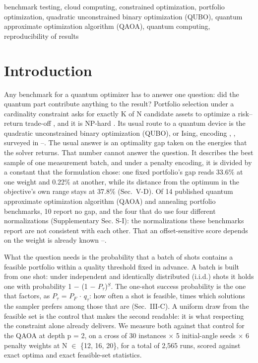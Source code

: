 \documentclass{ieeeaccess}
\begin{document}
\begin{keywords}
benchmark testing, cloud computing, constrained optimization, portfolio optimization, quadratic unconstrained binary optimization (QUBO), quantum approximate optimization algorithm (QAOA), quantum computing, reproducibility of results
\end{keywords}

\titlepgskip=-15pt

\maketitle


\section{Introduction}


Any benchmark for a quantum optimizer has to answer one question: did the quantum part contribute anything to the result? Portfolio selection under a cardinality constraint asks for exactly K of N candidate assets to optimize a risk--return trade-off \cite{ref1}, and it is NP-hard \cite{ref2}. Its usual route to a quantum device is the quadratic unconstrained binary optimization (QUBO), or Ising, encoding \cite{ref3}, \cite{ref4}, surveyed in \cite{ref5}--\cite{ref7}. The usual answer is an optimality gap taken on the energies that the solver returns. That number cannot answer the question. It describes the best sample of one measurement batch, and under a penalty encoding, it is divided by a constant that the formulation chose: one fixed portfolio's gap reads 33.6\% at one weight and 0.22\% at another, while its distance from the optimum in the objective's own range stays at 37.8\% (Sec.~V-D). Of 14 published quantum approximate optimization algorithm (QAOA) and annealing portfolio benchmarks, 10 report no gap, and the four that do use four different normalizations (Supplementary Sec. S-I): the normalizations these benchmarks report are not consistent with each other. That an offset-sensitive score depends on the weight is already known \cite{ref8}--\cite{ref10}.


What the question needs is the probability that a batch of shots contains a feasible portfolio within a quality threshold fixed in advance. A batch is built from one shot: under independent and identically distributed (i.i.d.) shots it holds one with probability 1 $-$ (1 $-$ $P_{\tau}$)$^{S}$. The one-shot success probability is the one that factors, as $P_{\tau}$ = $P_{F}$ $\cdot$ $q_{\tau}$: how often a shot is feasible, times which solutions the sampler prefers among those that are (Sec.~III-C). A uniform draw from the feasible set is the control that makes the second readable: it is what respecting the constraint alone already delivers. We measure both against that control for the QAOA at depth p = 2, on a cross of 30 instances $\times$ 5 initial-angle seeds $\times$ 6 penalty weights at N $\in$ \{12, 16, 20\}, for a total of 2,565 runs, scored against exact optima and exact feasible-set statistics.
\end{document}
